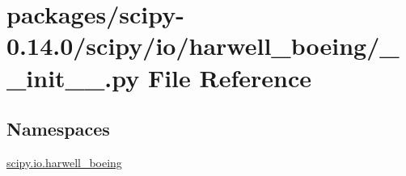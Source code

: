 \hypertarget{packages_2scipy-0_814_80_2scipy_2io_2harwell__boeing_2____init_____8py}{}\section{packages/scipy-\/0.14.0/scipy/io/harwell\+\_\+boeing/\+\_\+\+\_\+init\+\_\+\+\_\+.py File Reference}
\label{packages_2scipy-0_814_80_2scipy_2io_2harwell__boeing_2____init_____8py}
\subsection*{Namespaces}
\begin{DoxyCompactItemize}
\item 
 \hyperlink{namespacescipy_1_1io_1_1harwell__boeing}{scipy.\+io.\+harwell\+\_\+boeing}
\end{DoxyCompactItemize}
